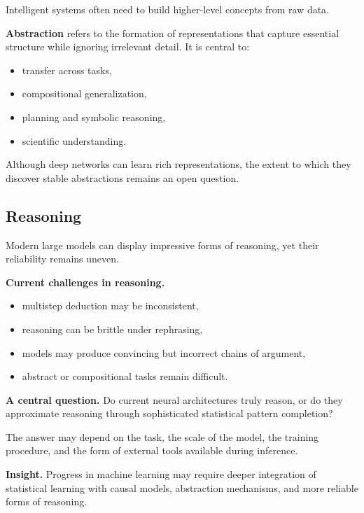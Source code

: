 Intelligent systems often need to build higher-level concepts from raw data.

\medskip

\noindent
\textbf{Abstraction} refers to the formation of representations that capture essential structure while ignoring irrelevant detail. It is central to:
\begin{itemize}
    \item transfer across tasks,
    \item compositional generalization,
    \item planning and symbolic reasoning,
    \item scientific understanding.
\end{itemize}

\medskip

\noindent
Although deep networks can learn rich representations, the extent to which they discover stable abstractions remains an open question.

\subsection{Reasoning}

Modern large models can display impressive forms of reasoning, yet their reliability remains uneven.

\medskip

\noindent
\textbf{Current challenges in reasoning.}
\begin{itemize}
    \item multistep deduction may be inconsistent,
    \item reasoning can be brittle under rephrasing,
    \item models may produce convincing but incorrect chains of argument,
    \item abstract or compositional tasks remain difficult.
\end{itemize}

\medskip

\noindent
\textbf{A central question.}
Do current neural architectures truly reason, or do they approximate reasoning through sophisticated statistical pattern completion?

\medskip

\noindent
The answer may depend on the task, the scale of the model, the training procedure, and the form of external tools available during inference.

\medskip

\noindent
\textbf{Insight.}
Progress in machine learning may require deeper integration of statistical learning with causal models, abstraction mechanisms, and more reliable forms of reasoning.

